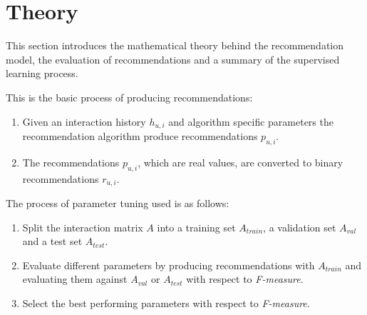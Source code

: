 
\section{Theory}\label{sec:theory}

This section introduces the mathematical theory behind the recommendation model, the evaluation of recommendations and a summary of the supervised learning process.

This is the basic process of producing recommendations:

\begin{enumerate}
    \item Given an interaction history $h_{u, i}$ and algorithm specific parameters the recommendation algorithm produce recommendations $p_{u, i}$.
    \item The recommendations $p_{u, i}$, which are real values, are converted to binary recommendations $r_{u, i}$.
\end{enumerate}

The process of parameter tuning used is as follows:

\begin{enumerate}
    \item Split the interaction matrix $A$ into a training set $A_{train}$, a validation set $A_{val}$ and a test set $A_{test}$.
    \item Evaluate different parameters by producing recommendations with $A_{train}$ and evaluating them against $A_{val}$ or $A_{test}$ with respect to \textit{F-measure}.
    \item Select the best performing parameters with respect to \textit{F-measure}.
\end{enumerate}












\newpage




